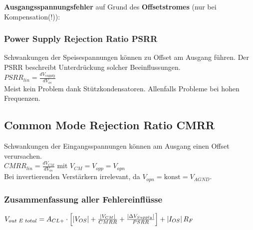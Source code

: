 			\begin{minipage}{18cm}
            	\vspace{3mm}
				\textbf{Ausgangsspannungsfehler} auf Grund des \textbf{Offsetstromes} (nur bei
				Kompensation(!)):
				\\
			\end{minipage}

		\subsubsection{Power Supply Rejection Ratio PSRR}
		Schwankungen der Speisespannungen können zu Offset am Ausgang führen.
		Der PSRR beschreibt Unterdrückung solcher Beeinflussungen. \bigskip \\
		$PSRR_{lin}=\frac{dV_{supply}}{dV_{os}}$ \bigskip \\
		Meist kein Problem dank Stützkondensatoren. 
		Allenfalls Probleme bei hohen Frequenzen.
		
		\subsection{Common Mode Rejection Ratio CMRR}
		Schwankungen der Eingangsspannungen können am Ausgang einen Offset verursachen. \bigskip \\
		$CMRR_{lin}=\frac{dV_{CM}}{dV_{os}}$ mit $V_{CM}=V_{opp}=V_{opn}$ \bigskip \\
		Bei invertierenden Verstärkern irrelevant, da $V_{opn}=\text{konst}=V_{AGND}$.

		\subsubsection{Zusammenfassung aller Fehlereinflüsse}
      $V_{out\hspace{1mm}E\hspace{1mm}total}=A_{CL+}\cdot\left[\left|V_{OS}\right|+\frac{\left|V_{CM}\right|}{CMRR}
            	+\frac{\left|\Delta V_{Supply}\right|}{PSRR}\right]+\left|I_{OS}\right|R_F$\\

